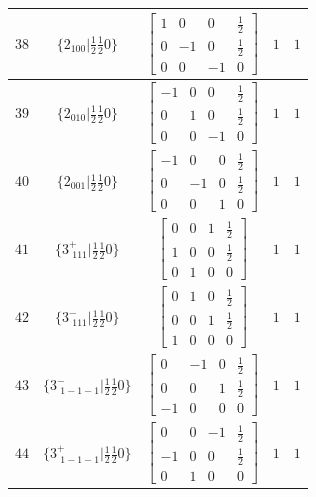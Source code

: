 \documentclass[fleqn,8pt]{jsarticle}
\begin{document}
\begin{longtable}{ccccc}
$ 38 $ & $ \{2{}_{100}|\frac{1}{2} \frac{1}{2} 0\} $ & $ \begin{bmatrix} 1 & 0 & 0 & \frac{1}{2} \\ 0 & -1 & 0 & \frac{1}{2} \\ 0 & 0 & -1 & 0 \end{bmatrix} $ & $ 1 $ & $ 1 $ \\ \hline
$ 39 $ & $ \{2{}_{010}|\frac{1}{2} \frac{1}{2} 0\} $ & $ \begin{bmatrix} -1 & 0 & 0 & \frac{1}{2} \\ 0 & 1 & 0 & \frac{1}{2} \\ 0 & 0 & -1 & 0 \end{bmatrix} $ & $ 1 $ & $ 1 $ \\ \hline
$ 40 $ & $ \{2{}_{001}|\frac{1}{2} \frac{1}{2} 0\} $ & $ \begin{bmatrix} -1 & 0 & 0 & \frac{1}{2} \\ 0 & -1 & 0 & \frac{1}{2} \\ 0 & 0 & 1 & 0 \end{bmatrix} $ & $ 1 $ & $ 1 $ \\ \hline
$ 41 $ & $ \{3^{+}_{\,\,111}|\frac{1}{2} \frac{1}{2} 0\} $ & $ \begin{bmatrix} 0 & 0 & 1 & \frac{1}{2} \\ 1 & 0 & 0 & \frac{1}{2} \\ 0 & 1 & 0 & 0 \end{bmatrix} $ & $ 1 $ & $ 1 $ \\ \hline
$ 42 $ & $ \{3^{-}_{\,\,111}|\frac{1}{2} \frac{1}{2} 0\} $ & $ \begin{bmatrix} 0 & 1 & 0 & \frac{1}{2} \\ 0 & 0 & 1 & \frac{1}{2} \\ 1 & 0 & 0 & 0 \end{bmatrix} $ & $ 1 $ & $ 1 $ \\ \hline
$ 43 $ & $ \{3^{-}_{\,\,1-1-1}|\frac{1}{2} \frac{1}{2} 0\} $ & $ \begin{bmatrix} 0 & -1 & 0 & \frac{1}{2} \\ 0 & 0 & 1 & \frac{1}{2} \\ -1 & 0 & 0 & 0 \end{bmatrix} $ & $ 1 $ & $ 1 $ \\ \hline
$ 44 $ & $ \{3^{+}_{\,\,1-1-1}|\frac{1}{2} \frac{1}{2} 0\} $ & $ \begin{bmatrix} 0 & 0 & -1 & \frac{1}{2} \\ -1 & 0 & 0 & \frac{1}{2} \\ 0 & 1 & 0 & 0 \end{bmatrix} $ & $ 1 $ & $ 1 $ \\ \hline

\end{longtable}
\end{document}
